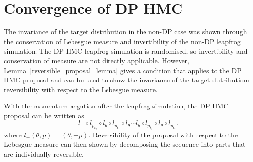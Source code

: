\documentclass[english,twoside,openright]{HYgraduMLDS}
\begin{document}
\section{Convergence of DP HMC}\label{dp_hmc_convergence_section}

The invariance of the target distribution in the non-DP case
was shown through the conservation of Lebesgue measure and invertibility of
the non-DP leapfrog simulation. The
DP HMC leapfrog simulation is randomised, so invertibility and conservation
of measure are not directly applicable. However,
Lemma~\ref{reversible_proposal_lemma} gives a condition that applies to
the DP HMC proposal and can be used to show the invariance of the target
distribution: reversibility with respect to the Lebesgue measure.

With the momentum negation after the leapfrog simulation, the DP HMC proposal
can be written as
\[
  l_{-}\circ l_{p_{t_{2}}}\circ l_{\theta}\circ l_{p_{t_{1}}}\circ l_{\theta}\dotsb
  l_{\theta}\circ l_{p_{t_{1}}}\circ l_{\theta}\circ l_{p_{t_{2}}}.
\]
where \(l_{-}(\theta, p) = (\theta, -p)\). Reversibility of the proposal
with respect to the Lebesgue measure can then shown by
decomposing the sequence into parts that are individually reversible.
\end{document}
